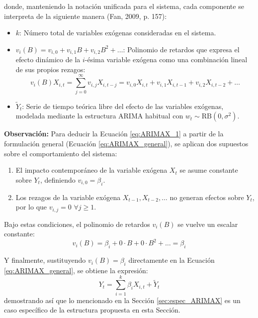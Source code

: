 \documentclass[11pt,letterpaper]{article}
\begin{document}
donde, manteniendo la notación unificada para el sistema, cada componente se interpreta de la siguiente manera (Fan, 2009, p. 157):
\begin{itemize}
    \item $k$: Número total de variables exógenas consideradas en el sistema.
    \item $v_i(B) = v_{i,0} + v_{i,1}B + v_{i,2}B^2 + \dots$: Polinomio de retardos que expresa el efecto dinámico de la $i$-ésima variable exógena como una combinación lineal de sus propios rezagos:
    \[
    v_i(B)X_{i,t} = \sum_{j=0}^{\infty} v_{i,j} X_{i,t-j} = v_{i,0}X_{i,t}+v_{i,1}X_{i,t-1}+v_{i,2}X_{i,t-2}+ \dots
    \]
    \item $\tilde{Y}_t$: Serie de tiempo teórica libre del efecto de las variables exógenas, modelada mediante la estructura ARIMA habitual con $w_t \sim \text{RB}(0, \sigma^2)$.
\end{itemize}

\vspace{0.3cm}

\textbf{Observación:}
Para deducir la Ecuación \ref{eq:ARIMAX_1} a partir de la formulación general (Ecuación \ref{eq:ARIMAX_general}), se aplican dos supuestos sobre el comportamiento del sistema:
\begin{enumerate}
\item El impacto contemporáneo de la variable exógena $X_t$ se asume constante sobre $Y_t$, definiendo $v_{i,0} = \beta_i$.
\item Los rezagos de la variable exógena $X_{t-1}, X_{t-2}, \dots$ no generan efectos sobre $Y_t$, por lo que $v_{i,j} = 0$ $\forall j \geq 1$.
\end{enumerate}

Bajo estas condiciones, el polinomio de retardos $v_i(B)$ se vuelve un escalar constante:
\begin{equation*}
v_i(B) = \beta_i + 0 \cdot B + 0 \cdot B^2 + \dots = \beta_i
\end{equation*}

Y finalmente, sustituyendo $v_i(B) = \beta_i$ directamente en la Ecuación \ref{eq:ARIMAX_general}, se obtiene la expresión:
\[Y_t = \sum_{i=1}^k \beta_i X_{i,t} + \tilde{Y}_t\] 
demostrando así que lo mencionado en la Sección \ref{sec:espec_ARIMAX} es un caso específico de la estructura propuesta en esta Sección.
\end{document}
